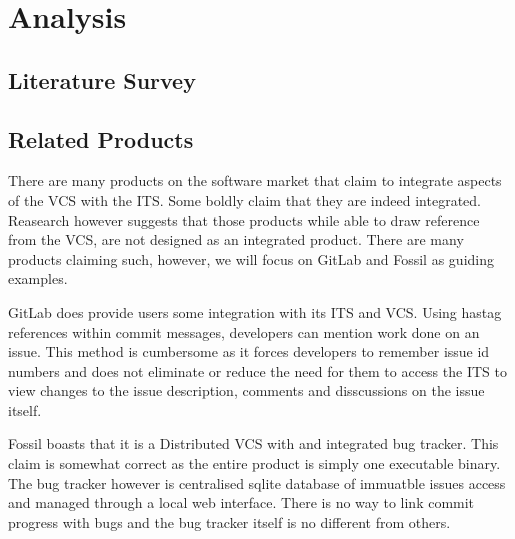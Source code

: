 \documentclass{mproj}
\begin{document}
\chapter{Analysis}\label{analysis}







\section{Literature Survey}  %


\section{Related Products}

There are many products on the software market that claim to integrate aspects of the VCS with the ITS. Some boldly claim that they are indeed integrated. Reasearch however suggests that those products while able to draw reference from the VCS, are not designed as an integrated product. There are many products claiming such, however, we will focus on GitLab and Fossil as guiding examples.

GitLab does provide users some integration with its ITS and VCS. Using hastag references within commit messages, developers can mention work done on an issue. This method is cumbersome as it forces developers to remember issue id numbers and does not eliminate or reduce the need for them to access the ITS to view changes to the issue description, comments and disscussions on the issue itself.

Fossil boasts that it is a Distributed VCS with and integrated bug tracker. This claim is somewhat correct as the entire product is simply one executable binary. The bug tracker however is centralised sqlite database of immuatble issues access and managed through a local web interface. There is no way to link commit progress with bugs and the bug tracker itself is no different from others.
\end{document}
